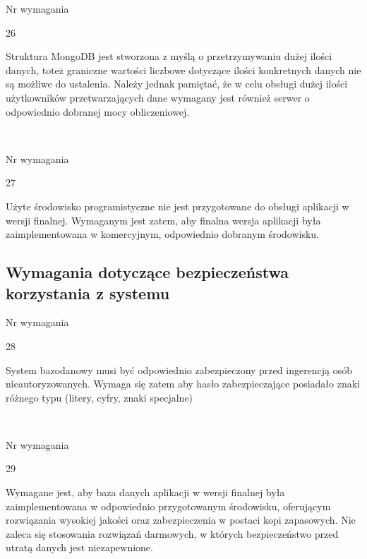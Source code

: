 \documentclass[eng,printmode]{mgr}
\begin{document}
\begin{labeling}{Nr wymagania}
 \item [\textbf{Nr wymagania}:] 26
 \item [\textbf{Treść}:] Struktura MongoDB jest stworzona z myślą o przetrzymywaniu dużej ilości danych, toteż graniczne wartości liczbowe dotyczące ilości konkretnych danych nie są możliwe do ustalenia. Należy jednak pamiętać, że w celu obsługi dużej ilości użytkowników przetwarzających dane wymagany jest również serwer o odpowiednio dobranej mocy obliczeniowej.
\end{labeling} \ \\

\begin{labeling}{Nr wymagania}
 \item [\textbf{Nr wymagania}:] 27
 \item [\textbf{Treść}:] Użyte środowisko programistyczne nie jest przygotowane do obsługi aplikacji w wersji finalnej. Wymaganym jest zatem, aby finalna wersja aplikacji była zaimplementowana w komercyjnym, odpowiednio dobranym środowisku.
\end{labeling}

\subsection{Wymagania dotyczące bezpieczeństwa korzystania z systemu}
\begin{labeling}{Nr wymagania}
 \item [\textbf{Nr wymagania}:] 28
 \item [\textbf{Treść}:] System bazodanowy musi być odpowiednio zabezpieczony przed ingerencją osób nieautoryzowanych. Wymaga się zatem aby hasło zabezpieczające posiadało znaki różnego typu (litery, cyfry, znaki specjalne)
\end{labeling} \ \\

\begin{labeling}{Nr wymagania}
 \item [\textbf{Nr wymagania}:] 29
 \item [\textbf{Treść}:] Wymagane jest, aby baza danych aplikacji w wersji finalnej była zaimplementowana w odpowiednio przygotowanym środowisku, oferującym rozwiązania wysokiej jakości oraz zabezpieczenia w postaci kopi zapasowych. Nie zaleca się stosowania rozwiązań darmowych, w których bezpieczeństwo przed utratą danych jest niezapewnione.
\end{labeling} \ \\
\end{document}
